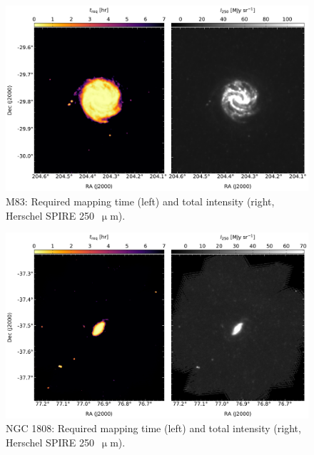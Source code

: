 \begin{figure}[!htbp]
\centering
\includegraphics[width=\textwidth]{figures/galaxies/m83}
\caption[~M83 required mapping time.]{M83: Required mapping time (left) and total intensity (right, Herschel SPIRE 250~$\upmu$m).}
\label{fig:m83}
\end{figure}

\begin{figure}[!htbp]
\centering
\includegraphics[width=\textwidth]{figures/galaxies/ngc1808}
\caption[~NGC 1808 required mapping time.]{NGC 1808: Required mapping time (left) and total intensity (right, Herschel SPIRE 250~$\upmu$m).}
\label{fig:ngc1808}
\end{figure}
